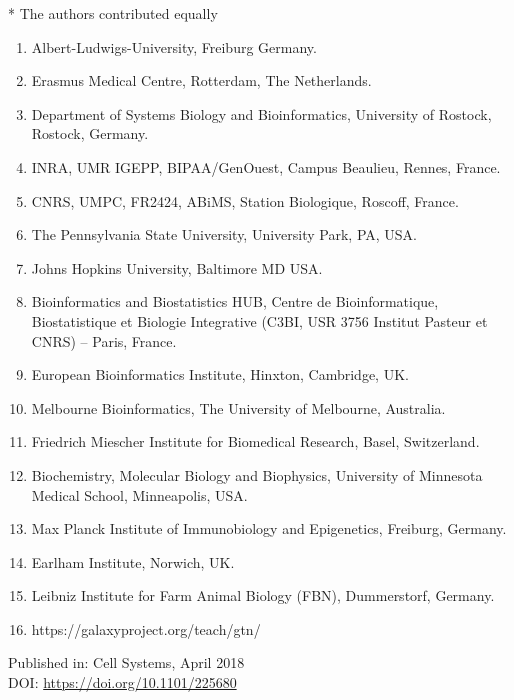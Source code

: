 * The authors contributed equally

\small
\begin{enumerate}
\itemsep-0.5em
\item Albert-Ludwigs-University, Freiburg  Germany. \label{affil:freiburg}
\item Erasmus Medical Centre, Rotterdam, The Netherlands. \label{affil:emc}
\item Department of Systems Biology and Bioinformatics, University of Rostock, Rostock, Germany. \label{affil:rostock}
\item INRA, UMR IGEPP, BIPAA/GenOuest, Campus Beaulieu, Rennes, France. \label{affil:abretaud}
\item CNRS, UMPC, FR2424, ABiMS, Station Biologique, Roscoff, France. \label{affil:roscoff}
\item The Pennsylvania State University, University Park, PA, USA. \label{affil:pennstate}
\item Johns Hopkins University, Baltimore MD USA. \label{affil:hopkins}
\item Bioinformatics and Biostatistics HUB, Centre de Bioinformatique, Biostatistique et Biologie Integrative (C3BI, USR 3756 Institut Pasteur et CNRS) – Paris, France. \label{affil:pasteur}
\item European Bioinformatics Institute, Hinxton, Cambridge, UK. \label{affil:ebi}
\item Melbourne Bioinformatics, The University of Melbourne, Australia. \label{affil:melbourne}
\item Friedrich Miescher Institute for Biomedical Research, Basel, Switzerland. \label{affil:basel}
\item Biochemistry, Molecular Biology and Biophysics, University of Minnesota Medical School, Minneapolis, USA. \label{affil:minnesota}
\item Max Planck Institute of Immunobiology and Epigenetics, Freiburg, Germany. \label{affil:maxplanck}
\item Earlham Institute, Norwich, UK. \label{affil:earlham}
\item Leibniz Institute for Farm Animal Biology (FBN), Dummerstorf, Germany. \label{affil:leibniz}
\item https://galaxyproject.org/teach/gtn/ \label{affil:gtn}


\end{enumerate}
\normalsize

Published in: Cell Systems, April 2018 \\
DOI: \url{https://doi.org/10.1101/225680 } \\

